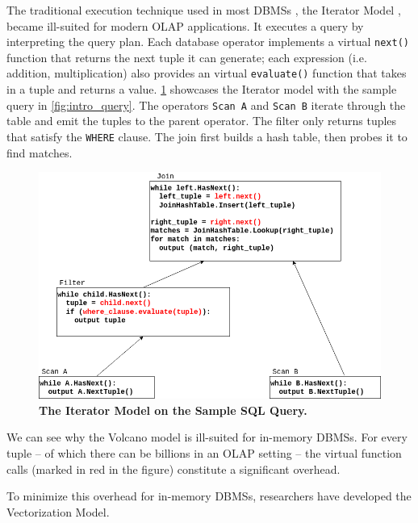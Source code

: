 \documentclass[12pt]{cmuthesis}
\begin{document}
The traditional execution technique used in most DBMSs \cite{mysql, posrgres}, the Iterator Model \cite{volcano}, became ill-suited for modern OLAP applications. It executes a query by interpreting the query plan. Each database operator implements a virtual \texttt{next()} function that returns the next tuple it can generate; each expression (i.e. addition, multiplication) also provides an virtual \texttt{evaluate()} function that takes in a tuple and returns a value. \cref{fig:volcano_graph} showcases the Iterator model with the sample query in \cref{fig:intro_query}. The operators \texttt{Scan A} and \texttt{Scan B} iterate through the table and emit the tuples to the parent operator. The filter only returns tuples that satisfy the \texttt{WHERE} clause. The join first builds a hash table, then probes it to find matches.

\begin{figure}[t!]
    \centering
    \includegraphics[scale=0.5]{images/Volcano.png}
    \caption{\textbf{The Iterator Model on the Sample SQL Query.}}
    \label{fig:volcano_graph}
\end{figure}


We can see why the Volcano model is ill-suited for in-memory DBMSs. For every tuple -- of which there can be billions in an OLAP setting -- the virtual function calls (marked in red in the figure) constitute a significant overhead.

To minimize this overhead for in-memory DBMSs, researchers have developed the Vectorization Model.



\iffalse
\end{document}
